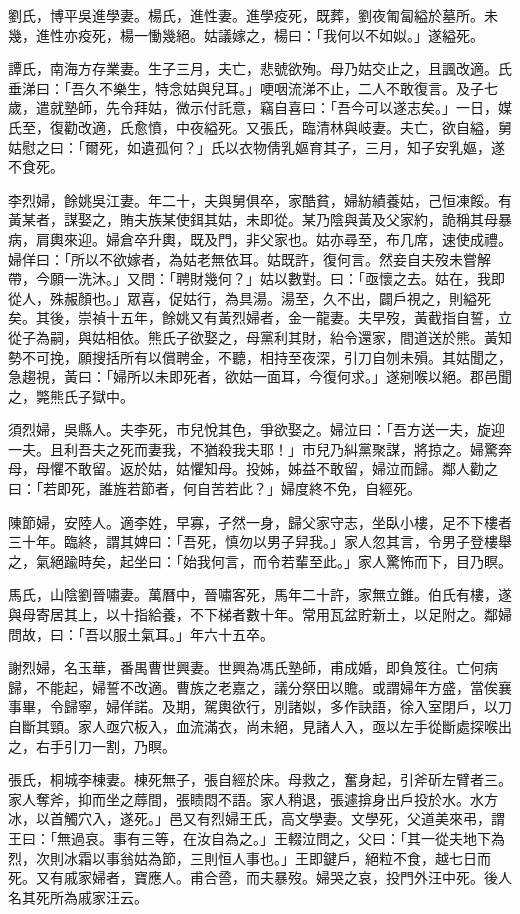 \begin{pinyinscope}
劉氏，博平吳進學妻。楊氏，進性妻。進學疫死，既葬，劉夜匍匐縊於墓所。未幾，進性亦疫死，楊一慟幾絕。姑議嫁之，楊曰：「我何以不如姒。」遂縊死。

譚氏，南海方存業妻。生子三月，夫亡，悲號欲殉。母乃姑交止之，且諷改適。氏垂涕曰：「吾久不樂生，特念姑與兒耳。」哽咽流涕不止，二人不敢復言。及子七歲，遣就塾師，先令拜姑，微示付託意，竊自喜曰：「吾今可以遂志矣。」一日，媒氏至，復勸改適，氏愈憤，中夜縊死。又張氏，臨清林與岐妻。夫亡，欲自縊，舅姑慰之曰：「爾死，如遺孤何？」氏以衣物倩乳嫗育其子，三月，知子安乳嫗，遂不食死。

李烈婦，餘姚吳江妻。年二十，夫與舅俱卒，家酷貧，婦紡績養姑，己恒凍餒。有黃某者，謀娶之，賄夫族某使鉺其姑，未即從。某乃陰與黃及父家約，詭稱其母暴病，肩輿來迎。婦倉卒升輿，既及門，非父家也。姑亦尋至，布几席，速使成禮。婦佯曰：「所以不欲嫁者，為姑老無依耳。姑既許，復何言。然妾自夫歿未嘗解帶，今願一洗沐。」又問：「聘財幾何？」姑以數對。曰：「亟懷之去。姑在，我即從人，殊赧顏也。」眾喜，促姑行，為具湯。湯至，久不出，闢戶視之，則縊死矣。其後，崇禎十五年，餘姚又有黃烈婦者，金一龍妻。夫早歿，黃截指自誓，立從子為嗣，與姑相依。熊氏子欲娶之，母黨利其財，紿令還家，間道送於熊。黃知勢不可挽，願搜括所有以償聘金，不聽，相持至夜深，引刀自刎未殞。其姑聞之，急趨視，黃曰：「婦所以未即死者，欲姑一面耳，今復何求。」遂剜喉以絕。郡邑聞之，斃熊氏子獄中。

須烈婦，吳縣人。夫李死，市兒悅其色，爭欲娶之。婦泣曰：「吾方送一夫，旋迎一夫。且利吾夫之死而妻我，不猶殺我夫耶！」市兒乃糾黨聚謀，將掠之。婦驚奔母，母懼不敢留。返於姑，姑懼知母。投姊，姊益不敢留，婦泣而歸。鄰人勸之曰：「若即死，誰旌若節者，何自苦若此？」婦度終不免，自經死。

陳節婦，安陸人。適李姓，早寡，孑然一身，歸父家守志，坐臥小樓，足不下樓者三十年。臨終，謂其婢曰：「吾死，慎勿以男子舁我。」家人忽其言，令男子登樓舉之，氣絕踰時矣，起坐曰：「始我何言，而令若輩至此。」家人驚怖而下，目乃瞑。

馬氏，山陰劉晉嘯妻。萬曆中，晉嘯客死，馬年二十許，家無立錐。伯氏有樓，遂與母寄居其上，以十指給養，不下梯者數十年。常用瓦盆貯新土，以足附之。鄰婦問故，曰：「吾以服土氣耳。」年六十五卒。

謝烈婦，名玉華，番禺曹世興妻。世興為馮氏塾師，甫成婚，即負笈往。亡何病歸，不能起，婦誓不改適。曹族之老嘉之，議分祭田以贍。或謂婦年方盛，當俟襄事畢，令歸寧，婦佯諾。及期，駕輿欲行，別諸姒，多作訣語，徐入室閉戶，以刀自斷其頸。家人亟穴板入，血流滿衣，尚未絕，見諸人入，亟以左手從斷處探喉出之，右手引刀一割，乃瞑。

張氏，桐城李棟妻。棟死無子，張自經於床。母救之，奮身起，引斧斫左臂者三。家人奪斧，抑而坐之蓐間，張瞆悶不語。家人稍退，張遽揜身出戶投於水。水方冰，以首觸穴入，遂死。」邑又有烈婦王氏，高文學妻。文學死，父道美來弔，謂王曰：「無過哀。事有三等，在汝自為之。」王輟泣問之，父曰：「其一從夫地下為烈，次則冰霜以事翁姑為節，三則恒人事也。」王即鍵戶，絕粒不食，越七日而死。又有戚家婦者，寶應人。甫合巹，而夫暴歿。婦哭之哀，投門外汪中死。後人名其死所為戚家汪云。


\end{pinyinscope}
